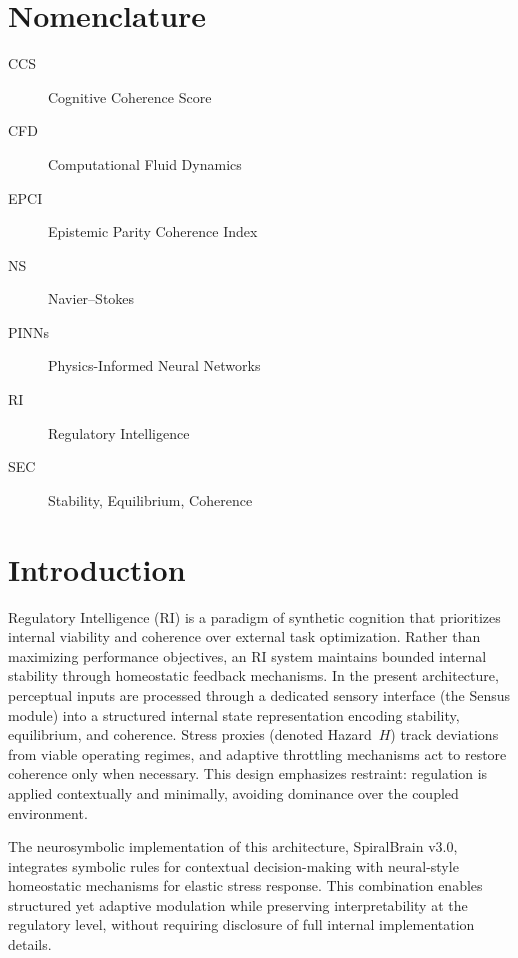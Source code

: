 \documentclass[12pt,a4paper]{article}
\begin{document}
\section*{Nomenclature}

\begin{description}
\item[CCS] Cognitive Coherence Score
\item[CFD] Computational Fluid Dynamics
\item[EPCI] Epistemic Parity Coherence Index
\item[NS] Navier--Stokes
\item[PINNs] Physics-Informed Neural Networks
\item[RI] Regulatory Intelligence
\item[SEC] Stability, Equilibrium, Coherence
\end{description}

\section{Introduction}

Regulatory Intelligence (RI) is a paradigm of synthetic cognition that prioritizes internal viability and coherence over external task optimization. Rather than maximizing performance objectives, an RI system maintains bounded internal stability through homeostatic feedback mechanisms. In the present architecture, perceptual inputs are processed through a dedicated sensory interface (the Sensus module) into a structured internal state representation encoding stability, equilibrium, and coherence. Stress proxies (denoted Hazard~$H$) track deviations from viable operating regimes, and adaptive throttling mechanisms act to restore coherence only when necessary. This design emphasizes restraint: regulation is applied contextually and minimally, avoiding dominance over the coupled environment.

The neurosymbolic implementation of this architecture, SpiralBrain v3.0, integrates symbolic rules for contextual decision-making with neural-style homeostatic mechanisms for elastic stress response. This combination enables structured yet adaptive modulation while preserving interpretability at the regulatory level, without requiring disclosure of full internal implementation details.
\end{document}
